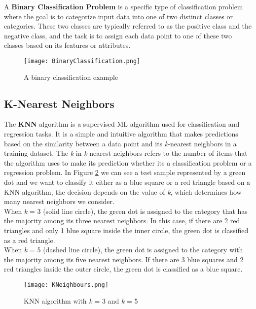 A \textbf{Binary Classification Problem} is a specific type of classification problem where the goal is to categorize input data into one of two distinct classes or categories. 
These two classes are typically referred to as the positive class and the negative class, and the task is to assign each data point to one of these two classes based on its features or attributes.
\begin{figure}[H]
  \centering
  \texttt{[image: BinaryClassification.png]}
  \caption{A binary classification example}
  \label{fig:bin_classification}
\end{figure}

\subsection{K-Nearest Neighbors}
\label{subsec:KNN}

The \textbf{KNN} algorithm is a supervised ML algorithm used for classification and regression tasks.
It is a simple and intuitive algorithm that makes predictions based on the similarity between a data point and its \textit{k}-nearest neighbors in a training dataset.
The \textit{k} in \textit{k}-nearest neighbors refers to the number of items that the algorithm uses to make its prediction whether its a classification problem or a regression problem.
In Figure \ref{fig:knn} we can see a test sample represented by a green dot and we want to classify 
it either as a blue square or a red triangle based on a KNN algorithm, the decision depends on the value of \textit{k}, which determines how many nearest neighbors we consider.\\
When \textit{k} = 3 (solid line circle), the green dot is assigned to the category that has the majority among its three nearest neighbors. 
In this case, if there are 2 red triangles and only 1 blue square inside the inner circle, the green dot is classified as a red triangle. \\
When \textit{k} = 5 (dashed line circle), the green dot is assigned to the category with the majority among its five nearest neighbors. 
If there are 3 blue squares and 2 red triangles inside the outer circle, the green dot is classified as a blue square.
\begin{figure}[H]
    \centering
    \texttt{[image: KNeighbours.png]}
    \caption{KNN algorithm with \textit{k} = 3 and \textit{k} = 5}
    \label{fig:knn}
\end{figure}


